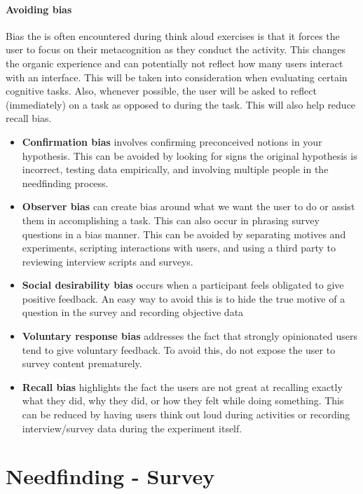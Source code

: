 \paragraph{Avoiding bias}
Bias the is often encountered during think aloud exercises is that it forces the user to focus on their metacognition as they conduct the activity. This changes the organic experience and can potentially not reflect how many users interact with an interface. This will be taken into consideration when evaluating certain cognitive tasks. Also, whenever possible, the user will be asked to reflect (immediately) on a task as opposed to during the task. This will also help reduce recall bias.

\begin{itemize}
\item
  \textbf{Confirmation bias} involves confirming preconceived notions in your hypothesis. This can be avoided by looking for signs the original hypothesis is incorrect, testing data empirically, and involving multiple people in the needfinding process.
\item
  \textbf{Observer bias} can create bias around what we want the user to do or assist them in accomplishing a task. This can also occur in phrasing survey questions in a bias manner. This can be avoided by separating motives and experiments, scripting interactions with users, and using a third party to reviewing interview scripts and surveys.
\item
  \textbf{Social desirability bias} occurs when a participant feels obligated to give positive feedback. An easy way to avoid this is to hide the true motive of a question in the survey and recording objective data
\item
  \textbf{Voluntary response bias} addresses the fact that strongly opinionated users tend to give voluntary feedback. To avoid this, do not expose the user to survey content prematurely.
\item
  \textbf{Recall bias} highlights the fact the users are not great at recalling exactly what they did, why they did, or how they felt while doing something. This can be reduced by having users think out loud during activities or recording interview/survey data during the experiment itself.
\end{itemize}


\section{Needfinding - Survey}

